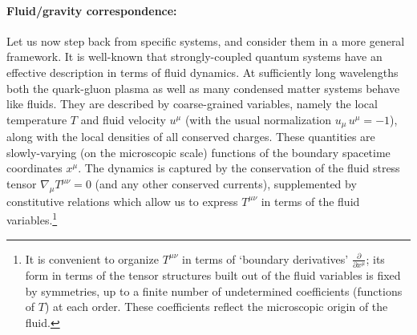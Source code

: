 \documentclass[12pt,a4paper]{article}
\begin{document}
\paragraph{Fluid/gravity correspondence:}  %
Let us now step back from specific systems, and consider them in a more general framework.
It is well-known that strongly-coupled quantum systems have an effective description in terms of fluid dynamics.  At sufficiently long wavelengths both the quark-gluon plasma as well as many condensed matter systems  behave like fluids.  They are described by coarse-grained variables, namely the local temperature $T$ and fluid velocity $u^\mu$ (with the usual normalization $u_\mu \, u^\mu = -1$), along with the local densities of all conserved charges.  These quantities are slowly-varying (on the microscopic scale) functions of the boundary spacetime coordinates $x^\mu$.
The dynamics is captured by the conservation of the fluid stress tensor $\nabla_\mu T^{\mu\nu} = 0$ (and any other conserved currents), supplemented by constitutive relations which allow us to express $T^{\mu\nu}$ in terms of the fluid variables.\footnote{
It is convenient to organize $T^{\mu\nu}$ in terms of `boundary derivatives' $\frac{\partial }{\partial x^\mu}$; its form in terms of the tensor structures built out of the fluid variables is fixed by symmetries, up to a finite number of undetermined coefficients (functions of $T$) at each order.  These coefficients reflect the microscopic origin of the fluid.}
\end{document}
